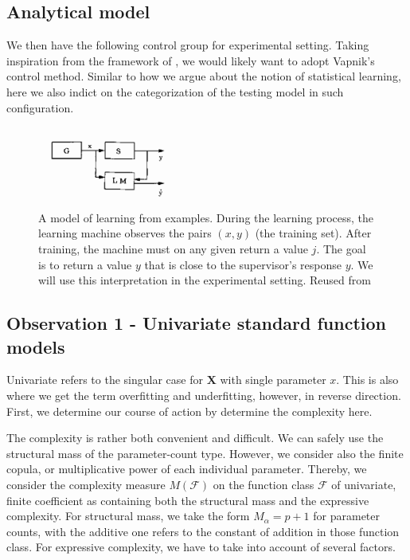 \documentclass{article}
\begin{document}
\subsection{Analytical model}

We then have the following control group for experimental setting. Taking inspiration from the framework of \cite{Vapnik1999-VAPTNO}, we would likely want to adopt Vapnik's control method. Similar to how we argue about the notion of statistical learning, here we also indict on the categorization of the testing model in such configuration. 

\begin{figure}
    \centering
    \includegraphics[width=0.4\textwidth]{img/vapniksetting.png}
    \caption{A model of learning from examples. During the learning process, the learning machine observes the pairs $(x, y)$ (the training set). After training, the machine must on any given return a value $j$. The goal is to return a value $y$ that is close to the supervisor's response $y$. We will use this interpretation in the experimental setting. Reused from \cite{Vapnik1999-VAPTNO}}
\end{figure}


\subsection{Observation 1 - Univariate standard function models}

Univariate refers to the singular case for $\mathbf{X}$ with single parameter $x$. This is also where we get the term overfitting and underfitting, however, in reverse direction. First, we determine our course of action by determine the complexity here. 

The complexity is rather both convenient and difficult. We can safely use the structural mass of the parameter-count type. However, we consider also the finite copula, or multiplicative power of each individual parameter. Thereby, we consider the complexity measure $M(\mathcal{F})$ on the function class $\mathcal{F}$ of univariate, finite coefficient as containing both the structural mass and the expressive complexity. For structural mass, we take the form $M_{\alpha}= p+1$ for parameter counts, with the additive one refers to the constant of addition in those function class. For expressive complexity, we have to take into account of several factors. 
\end{document}
